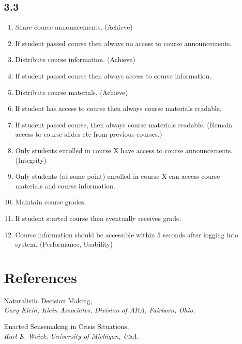 \section*{3.3}
\begin{enumerate}
	\item Share course announcements. (Achieve)
	\item If student passed course then always no access to course announcements.
	\item Distribute course information. (Achieve)
	\item If student passed course then always access to course information.
	\item Distribute course materials. (Achieve)
	\item If student has access to course then always course materials readable. 
	\item If student passed course, then always course materials readable. (Remain access to course slides etc from previous courses.)
	\item Only students enrolled in course X have access to course announcements. (Integrity)
	\item Only students (at some point) enrolled in course X can access course materials and course information.
	\item Maintain course grades. 
	\item If student started course then eventually receives grade.
	\item Course information should be accessible within 5 seconds after logging into system. (Performance, Usability)
\end{enumerate}


\chapter{References}

\begin{thebibliography}{9}

	Naturalistic Decision Making, \\
	\emph{Gary Klein, Klein Associates, Division of ARA, Fairborn, Ohio.}
	
	Enacted Sensemaking in Crisis Situations, \\
	\emph{Karl E. Weick, University of Michigan, USA.}
	
\end{thebibliography}


\appendix




